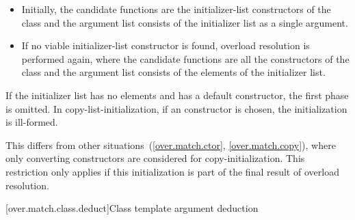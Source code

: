 \begin{itemize}
\item
Initially, the candidate functions are the initializer-list constructors
of the class  and
the argument list consists of the initializer list as a single argument.

\item
If no viable initializer-list constructor is found, overload resolution is
performed again, where the candidate functions are all the constructors of
the class  and
the argument list consists of the elements of the initializer list.
\end{itemize}

If the initializer list has no elements and  has a default constructor,
the first phase is omitted.
In copy-list-initialization, if an  constructor is
chosen, the initialization is ill-formed. \begin{note}
This differs from other situations~(\ref{over.match.ctor}, \ref{over.match.copy}),
where only converting constructors are considered for copy-initialization.
This restriction only
applies if this initialization is part of the final result of overload
resolution. \end{note}

[over.match.class.deduct]{Class template argument deduction}%
%

